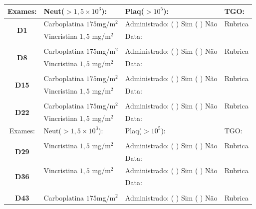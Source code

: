 \documentclass[11pt,a4paper,oldfontcommands]{memoir}
\begin{document}
\begin{center}
\begin{longtable}{p{1cm}p{4cm}|p{5cm}|p{3cm}}
    \hline
    \multicolumn{1}{c|}{Exames:}&{Neut(\(>1,5\times10^3\)):}&{Plaq(\(>10^5\)):}&{TGO:}\\
    \hline
    \multicolumn{1}{c|}{\multirow{2}{*}{\textbf{D1}}}&{Carboplatina \(175\)mg/m\(^2\)}&{Administrado: (  ) Sim (  ) Não}&{Rubrica}\\
    \multicolumn{1}{c|}{}&{Vincristina \(1,5\) mg/m\(^2\)}&{Data:}&\\
    \hline\\
    \hline
    \multicolumn{1}{c|}{\multirow{2}{*}{\textbf{D8}}}&{Carboplatina \(175\)mg/m\(^2\)}&{Administrado: (  ) Sim (  ) Não}&{Rubrica}\\
    \multicolumn{1}{c|}{}&{Vincristina \(1,5\) mg/m\(^2\)}&{Data:}&\\
    \hline
    \\
    \hline
    \multicolumn{1}{c|}{\multirow{2}{*}{\textbf{D15}}}&{Carboplatina \(175\)mg/m\(^2\)}&{Administrado: (  ) Sim (  ) Não}&{Rubrica}\\
    \multicolumn{1}{c|}{}&{Vincristina \(1,5\) mg/m\(^2\)}&{Data:}&\\
    \hline
    \\
    \hline
    \multicolumn{1}{c|}{\multirow{2}{*}{\textbf{D22}}}&{Carboplatina \(175\)mg/m\(^2\)}&{Administrado: (  ) Sim (  ) Não}&{Rubrica}\\
    \multicolumn{1}{c|}{}&{Vincristina \(1,5\) mg/m\(^2\)}&{Data:}&\\
    \hline
    \multicolumn{1}{c|}{Exames:}&{Neut(\(>1,5\times10^3\)):}&{Plaq(\(>10^5\)):}&{TGO:}
    \\
    \hline
    \\
    \hline
    \multicolumn{1}{c|}{\multirow{2}{*}{\textbf{D29}}}&{Vincristina \(1,5\) mg/m\(^2\)}&{Administrado: (  ) Sim (  ) Não}&{Rubrica}\\
    \multicolumn{1}{c|}{}&&{Data:}&\\
    \hline
    \hline
    \multicolumn{1}{c|}{\multirow{2}{*}{\textbf{D36}}}&{Vincristina \(1,5\) mg/m\(^2\)}&{Administrado: (  ) Sim (  ) Não}&{Rubrica}\\
    \multicolumn{1}{c|}{}&&{Data:}&\\
    \hline
    \\
    \hline
    \multicolumn{1}{c|}{\multirow{2}{*}{\textbf{D43}}}&{Carboplatina \(175\)mg/m\(^2\)}&{Administrado: (  ) Sim (  ) Não}&{Rubrica}\\

\end{longtable}
\end{center}
\end{document}
